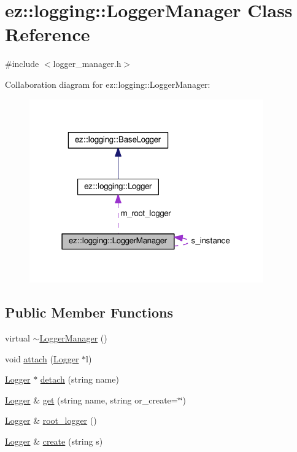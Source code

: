 \hypertarget{classez_1_1logging_1_1LoggerManager}{}\section{ez\+:\+:logging\+:\+:Logger\+Manager Class Reference}
\label{classez_1_1logging_1_1LoggerManager}


{\ttfamily \#include $<$logger\+\_\+manager.\+h$>$}



Collaboration diagram for ez\+:\+:logging\+:\+:Logger\+Manager\+:
\nopagebreak
\begin{figure}[H]
\begin{center}
\leavevmode
\includegraphics[width=286pt]{classez_1_1logging_1_1LoggerManager__coll__graph}
\end{center}
\end{figure}
\subsection*{Public Member Functions}
\begin{DoxyCompactItemize}
\item 
virtual \hyperlink{classez_1_1logging_1_1LoggerManager_a0738a5887eb50eba0f08a250b9aa7675}{$\sim$\+Logger\+Manager} ()
\item 
void \hyperlink{classez_1_1logging_1_1LoggerManager_a0358094fdf703ed5a5ff021fd5f94efd}{attach} (\hyperlink{classez_1_1logging_1_1Logger}{Logger} $\ast$l)
\item 
\hyperlink{classez_1_1logging_1_1Logger}{Logger} $\ast$ \hyperlink{classez_1_1logging_1_1LoggerManager_a777dcb9907e2d3cc7a314df6617ba5fb}{detach} (string name)
\item 
\hyperlink{classez_1_1logging_1_1Logger}{Logger} \& \hyperlink{classez_1_1logging_1_1LoggerManager_a90c836448bef5099d16d03b37bf52661}{get} (string name, string or\+\_\+create=\char`\"{}\char`\"{})
\item 
\hyperlink{classez_1_1logging_1_1Logger}{Logger} \& \hyperlink{classez_1_1logging_1_1LoggerManager_aa5f5fae8e256e6f3dc4269d506723b31}{root\+\_\+logger} ()
\item 
\hyperlink{classez_1_1logging_1_1Logger}{Logger} \& \hyperlink{classez_1_1logging_1_1LoggerManager_aba82648266530bd33f74d865c4c55878}{create} (string s)
\end{DoxyCompactItemize}
